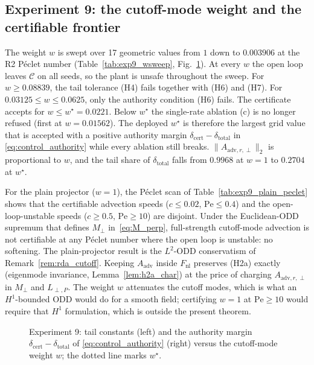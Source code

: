 

\subsection{Experiment 9: the cutoff-mode weight and the certifiable frontier}
The weight \(w\) is swept over 17 geometric values from \(1\) down to \(0.003906\) at the R2 P\'eclet number
(Table~\ref{tab:exp9_wsweep}, Fig.~\ref{fig:exp9}). At every \(w\) the open loop leaves \(\mathcal C\) on all seeds, so
the plant is unsafe throughout the sweep. For \(w \ge 0.08839\), the tail tolerance (H4) fails together with (H6) and
(H7). For \(0.03125 \le w \le 0.0625\), only the authority condition (H6) fails. The certificate accepts
for \(w \le w^\star = 0.0221\). Below \(w^\star\) the single-rate ablation (c) is no longer refused (first at
\(w = 0.01562\)). The deployed \(w^\star\) is therefore the largest grid value that is accepted with a positive
authority margin \(\delta_{\mathrm{cert}}-\delta_{\mathrm{total}}\) in \eqref{eq:control_authority} while every ablation still breaks. \(\|A_{\mathrm{adv},r,\perp}\|_2\) is proportional to
\(w\), and the tail share of \(\delta_{\mathrm{total}}\) falls from \(0.9968\) at \(w = 1\) to
\(0.2704\) at \(w^\star\).

For the plain projector (\(w = 1\)), the P\'eclet scan of Table~\ref{tab:exp9_plain_peclet} shows that the certifiable
advection speeds (\(c \le 0.02\), \(\mathrm{Pe} \le 0.4\)) and the open-loop-unstable speeds
(\(c \ge 0.5\), \(\mathrm{Pe} \ge 10\)) are disjoint. Under the Euclidean-ODD supremum that
defines \(M_\perp\) in~\eqref{eq:M_perp}, full-strength cutoff-mode advection is not certifiable at any P\'eclet number
where the open loop is unstable: no softening. The plain-projector result is the \(L^2\)-ODD conservatism of
Remark~\ref{rem:rda_cutoff}. Keeping \(A_{\mathrm{adv}}\) inside \(F_{\mathrm{nl}}\) preserves (H2a) exactly (eigenmode
invariance, Lemma~\ref{lem:h2a_char}) at the price of charging \(A_{\mathrm{adv},r,\perp}\) in \(M_\perp\) and
\(L_{\perp,P}\). The weight \(w\) attenuates the cutoff modes, which is what an \(H^1\)-bounded ODD would do for a smooth
field; certifying \(w = 1\) at \(\mathrm{Pe} \ge 10\) would require that \(H^1\) formulation,
which is outside the present theorem.



\begin{figure}[t]\centering{}
\caption{Experiment 9: tail constants (left) and the authority margin \(\delta_{\mathrm{cert}}-\delta_{\mathrm{total}}\) of \eqref{eq:control_authority} (right)
versus the cutoff-mode weight \(w\); the dotted line marks \(w^\star\).}\label{fig:exp9}\end{figure}

